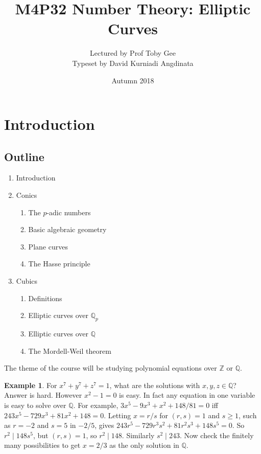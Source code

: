 \documentclass{article}
\title{M4P32 Number Theory: Elliptic Curves}
\author{Lectured by Prof Toby Gee \\ Typeset by David Kurniadi Angdinata}
\date{Autumn 2018}
\newcommand{\Z}{\mathbb{Z}}
\newcommand{\Q}{\mathbb{Q}}
\newcommand{\rb}[1]{\left( #1 \right)}
\theoremstyle{definition}\newtheorem{definition}{Definition}[section]
\theoremstyle{definition}\newtheorem{remark}[definition]{Remark}
\theoremstyle{definition}\newtheorem*{example}{Example}
\theoremstyle{definition}\newtheorem*{note}{Note}
\begin{document}
\maketitle

\vfill

\tableofcontents

\pagebreak


\section{Introduction}

\subsection{Outline}

\begin{enumerate}
\item Introduction
\item Conics
\begin{enumerate}
\item The $ p $-adic numbers
\item Basic algebraic geometry
\item Plane curves
\item The Hasse principle
\end{enumerate}
\item Cubics
\begin{enumerate}
\item Definitions
\item Elliptic curves over $ \Q_p $
\item Elliptic curves over $ \Q $
\item The Mordell-Weil theorem
\end{enumerate}
\end{enumerate}

The theme of the course will be studying polynomial equations over $ \Z $ or $ \Q $.

\begin{example}
For $ x^7 + y^7 + z^7 = 1 $, what are the solutions with $ x, y, z \in \Q $? Answer is hard. However $ x^2 - 1 = 0 $ is easy. In fact any equation in one variable is easy to solve over $ \Q $. For example, $ 3x^5 - 9x^3 + x^2 + 148 / 81 = 0 $ iff $ 243x^5 - 729x^3 + 81x^2 + 148 = 0 $. Letting $ x = r / s $ for $ \rb{r, s} = 1 $ and $ s \ge 1 $, such as $ r = -2 $ and $ s = 5 $ in $ -2 / 5 $, gives $ 243r^5 - 729r^3s^2 + 81r^2s^3 + 148s^5 = 0 $. So $ r^2 \mid 148s^5 $, but $ \rb{r, s} = 1 $, so $ r^2 \mid 148 $. Similarly $ s^2 \mid 243 $. Now check the finitely many possibilities to get $ x = 2 / 3 $ as the only solution in $ \Q $.
\end{example}
\end{document}

